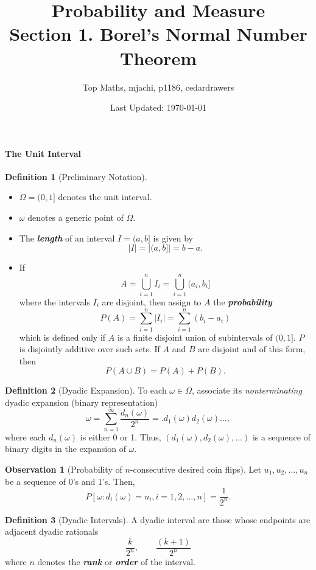 \documentclass[12pt]{article}
\title{Probability and Measure \\ Section 1. Borel's Normal Number Theorem}
\date{Last Updated: \today}
\author{Top Maths, mjachi, p1186, cedardrawers}
\theoremstyle{definition}
\newtheorem{definition}{Definition}
\newtheorem{observation}{Observation}
\begin{document}
	\maketitle 
	\paragraph{The Unit Interval}
		\begin{definition}[Preliminary Notation] ~
			\begin{itemize}
				\item $\Omega = (0, 1]$ denotes the unit interval.
				
				\item $\omega$ denotes a generic point of $\Omega$. 
				
				\item The \textbf{\textit{length}} of an interval $I = (a, b]$ is given by $$|I| = |(a, b]| = b - a.$$ 
				
				\item If $$A = \bigcup_{i = 1}^n I_i = \bigcup_{i = 1}^n (a_i, b_i]$$ where the intervals $I_i$ are disjoint, then assign to $A$ the \textbf{\textit{probability}} $$P(A) = \sum_{i = 1}^n |I_i| = \sum_{i = 1}^n (b_i - a_i)$$ which is defined only if $A$ is a finite disjoint union of subintervals of $(0, 1]$. $P$ is disjointly additive over such sets. If $A$ and $B$ are disjoint and of this form, then $$P(A \cup B) = P(A) + P(B).$$
 			\end{itemize}
		\end{definition}
		
		\begin{definition}[Dyadic Expansion]
			To each $\omega \in \Omega$, associate its \textit{nonterminating} dyadic expansion (binary representation) $$\omega = \sum_{n = 1}^\infty \frac{d_n(\omega)}{2^n} = .d_1(\omega)d_2(\omega)\dots,$$ where each $d_n(\omega)$ is either 0 or 1. Thus, $(d_1(\omega), d_2(\omega), \dots)$ is a sequence of binary digits in the expansion of $\omega$. 
		\end{definition} 
		
		\begin{observation}[Probability of $n$-consecutive desired coin flips]
			Let $u_1, u_2, \dots, u_n$ be a sequence of 0's and 1's. Then,  $$P[\omega : d_i(\omega) = u_i, i = 1, 2, \dots, n] = \frac{1}{2^n}.$$
		\end{observation}
		
		\begin{definition}[Dyadic Intervals]
			A dyadic interval are those whose endpoints are adjacent dyadic rationals $$\frac{k}{2^n}, \qquad \frac{(k + 1)}{2^n}$$ where $n$ denotes the \textbf{\textit{rank}} or \textbf{\textit{order}} of the interval. 
		\end{definition}
		
\end{document}
